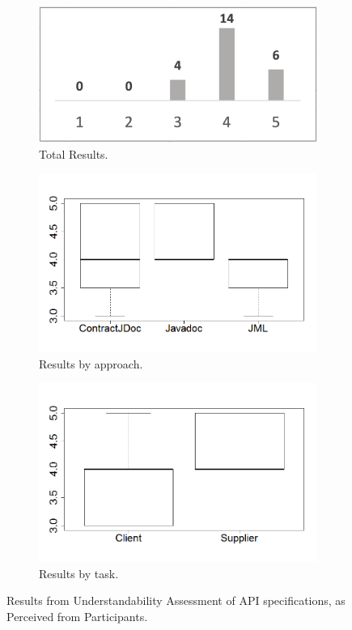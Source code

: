 \begin{figure}
\centering
\begin{subfigure}{.32\textwidth}
\includegraphics[width=1\textwidth]{figs/ExpAnswersTotal.png}
\caption{Total Results.}
\label{fig:ExpAnswersTotal}
\end{subfigure}
\begin{subfigure}{.33\textwidth}
\includegraphics[width=1\linewidth]{figs/boxplotApproachesEmpiricalStudy}
\caption{Results by approach.}
\label{fig:approachesEmpirical}
\end{subfigure}
\begin{subfigure}{.33\textwidth}
\includegraphics[width=1\linewidth]{figs/boxplotTasksEmpiricalStudy}
\caption{Results by task.}
\label{fig:tasksEmpirical}
\end{subfigure}
\caption{Results from Understandability Assessment of API specifications, as Perceived from Participants.}
\label{fig:empiricalResults}
\end{figure}

